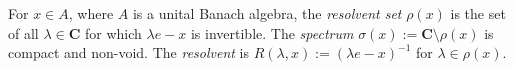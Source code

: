 For $x \in A$, where $A$ is a unital Banach algebra, the \emph{resolvent set} $\rho(x)$ is the set of all $\lambda \in \mathbf{C}$ for which $\lambda e - x$ is invertible. The \emph{spectrum} $\sigma(x) := \mathbf{C} \setminus \rho(x)$ is compact and non-void. The \emph{resolvent} is $R(\lambda, x) := (\lambda e - x)^{-1}$ for $\lambda \in \rho(x)$.
